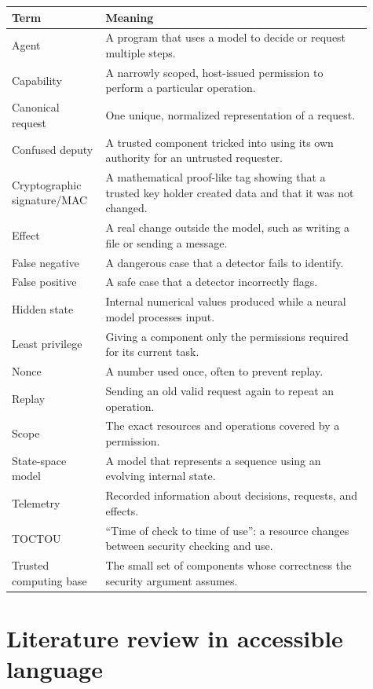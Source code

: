 \documentclass[11pt]{article}
\begin{document}
\begin{longtable}{p{0.23\linewidth}p{0.68\linewidth}}
\toprule
Term & Meaning \\
\midrule
Agent & A program that uses a model to decide or request multiple steps. \\
Capability & A narrowly scoped, host-issued permission to perform a particular operation. \\
Canonical request & One unique, normalized representation of a request. \\
Confused deputy & A trusted component tricked into using its own authority for an untrusted requester. \\
Cryptographic signature/MAC & A mathematical proof-like tag showing that a trusted key holder created data and that it was not changed. \\
Effect & A real change outside the model, such as writing a file or sending a message. \\
False negative & A dangerous case that a detector fails to identify. \\
False positive & A safe case that a detector incorrectly flags. \\
Hidden state & Internal numerical values produced while a neural model processes input. \\
Least privilege & Giving a component only the permissions required for its current task. \\
Nonce & A number used once, often to prevent replay. \\
Replay & Sending an old valid request again to repeat an operation. \\
Scope & The exact resources and operations covered by a permission. \\
State-space model & A model that represents a sequence using an evolving internal state. \\
Telemetry & Recorded information about decisions, requests, and effects. \\
TOCTOU & ``Time of check to time of use'': a resource changes between security checking and use. \\
Trusted computing base & The small set of components whose correctness the security argument assumes. \\
\bottomrule
\end{longtable}

\section{Literature review in accessible language}
\end{document}
